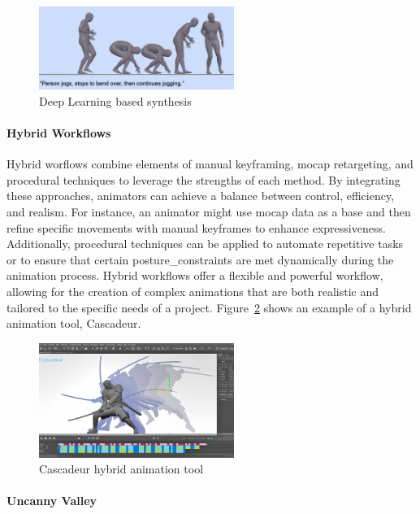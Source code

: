 \documentclass[../../main.tex]{subfiles}
\begin{document}
\begin{figure} 
  \centering \includegraphics[width = 2.5in]{chapters/background_work/images/deep_learning_synthesis.png} 
  \caption{Deep Learning based synthesis} 
  \label{fig:deep_learning_synthesis} 
\end{figure}

\paragraph{Hybrid Workflows}
\label{ch:background_work:sign_language_synthesis:3d_techniques:avatar_animation:hybrid_workflows}

Hybrid worflows combine elements of manual keyframing, mocap retargeting, and procedural techniques to leverage the strengths of each method. By integrating these approaches, animators can achieve a balance between control, efficiency, and realism. For instance, an animator might use mocap data as a base and then refine specific movements with manual keyframes to enhance expressiveness. Additionally, procedural techniques can be applied to automate repetitive tasks or to ensure that certain \gls{posture_constraint}s are met dynamically during the animation process. Hybrid workflows offer a flexible and powerful workflow, allowing for the creation of complex animations that are both realistic and tailored to the specific needs of a project. Figure~\ref{fig:cascadeur} shows an example of a hybrid animation tool, Cascadeur.

\begin{figure} 
  \centering \includegraphics[width = 2.5in]{chapters/background_work/images/cascadeur.png} 
  \caption{Cascadeur hybrid animation tool} 
  \label{fig:cascadeur} 
\end{figure}

\paragraph{Uncanny Valley}
\label{ch:background_work:sign_language_synthesis:3d_techniques:avatar_animation:uncanny_valley}
\end{document}
